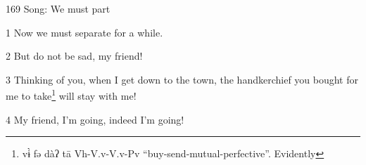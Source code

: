 
169 Song: We must part

1 Now we must separate for a while.

2 But do not be sad, my friend!

3 Thinking of you, when I get down to the town, the handkerchief you bought for
me to take\footnote{vɨ̀ fə dàʔ tā Vh-V.v-V.v-Pv ``buy-send-mutual-perfective''. Evidently} will stay with me!

4 My friend, I'm going, indeed I'm going!

